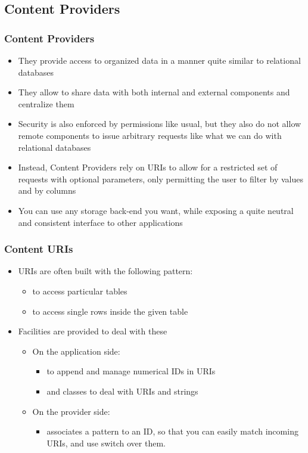 \subsection{Content Providers}

\begin{frame}
  \frametitle{Content Providers}
  \begin{itemize}
  \item They provide access to organized data in a manner quite
    similar to relational databases
  \item They allow to share data with both internal and external
    components and centralize them
  \item Security is also enforced by permissions like usual, but they
    also do not allow remote components to issue arbitrary requests
    like what we can do with relational databases
  \item Instead, Content Providers rely on URIs to allow for a restricted set of
    requests with optional parameters, only permitting the user to
    filter by values and by columns
  \item You can use any storage back-end you want, while exposing a
    quite neutral and consistent interface to other applications
  \end{itemize}
\end{frame}

\begin{frame}
  \frametitle{Content URIs}
  \begin{itemize}
  \item URIs are often built with the following pattern:
    \begin{itemize}
    \item {} to access particular tables
    \item {} to access
      single rows inside the given table
    \end{itemize}
  \item Facilities are provided to deal with these
    \begin{itemize}
    \item On the application side:
      \begin{itemize}
      \item {} to append and manage numerical IDs in URIs
      \item {} and  classes to deal with
        URIs and strings
      \end{itemize}
    \item On the provider side:
      \begin{itemize}
      \item {} associates a pattern to an ID, so that
        you can easily match incoming URIs, and use switch over them.
      \end{itemize}
    \end{itemize}
  \end{itemize}
\end{frame}

